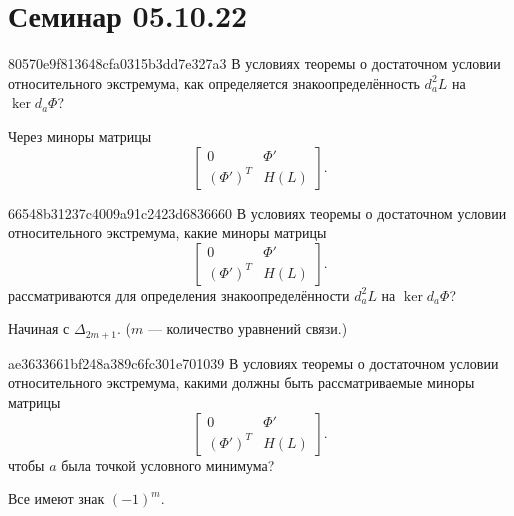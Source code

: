 \section{Семинар 05.10.22}
\begin{note}{80570e9f813648cfa0315b3dd7e327a3}
    В условиях теоремы о достаточном условии относительного экстремума, как определяется знакоопределённость \({ d^2_{a}L }\) на \({ \ker d_{a} \Phi }\)?

    \begin{cloze}{1}
        Через миноры матрицы
        \[
            \begin{bmatrix}
                0 & \Phi' \\
                (\Phi')^{T} & H(L)
            \end{bmatrix}.
        \]
    \end{cloze}
\end{note}

\begin{note}{66548b31237c4009a91c2423d6836660}
    В условиях теоремы о достаточном условии относительного экстремума, какие миноры матрицы
    \[
        \begin{bmatrix}
            0 & \Phi' \\
            (\Phi')^{T} & H(L)
        \end{bmatrix}.
    \]
    рассматриваются для определения знакоопределённости \({ d^2_{a}L }\) на \({ \ker d_{a} \Phi }\)?

    \begin{cloze}{1}
        Начиная с \({ \Delta_{2m + 1} }\). \quad (\({ m }\) --- количество уравнений связи.)
    \end{cloze}
\end{note}

\begin{note}{ae3633661bf248a389c6fc301e701039}
    В условиях теоремы о достаточном условии относительного экстремума, какими должны быть рассматриваемые миноры матрицы
    \[
        \begin{bmatrix}
            0 & \Phi' \\
            (\Phi')^{T} & H(L)
        \end{bmatrix}.
    \]
    чтобы \({ a }\) была точкой условного минимума?

    \begin{cloze}{1}
        Все имеют знак \({ (-1)^{m} }\).
    \end{cloze}
\end{note}

